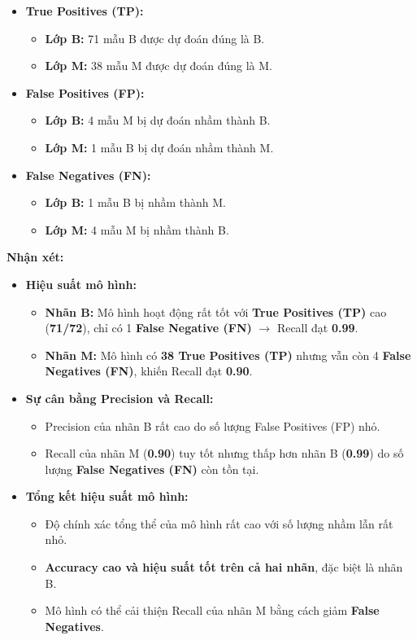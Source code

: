 \begin{itemize}
	\item \textbf{True Positives (TP):}
	\begin{itemize}
		\item \textbf{Lớp B:} 71 mẫu B được dự đoán đúng là B.
		\item \textbf{Lớp M:} 38 mẫu M được dự đoán đúng là M.
	\end{itemize}
	
	\item \textbf{False Positives (FP):}
	\begin{itemize}
		\item \textbf{Lớp B:} 4 mẫu M bị dự đoán nhầm thành B.
		\item \textbf{Lớp M:} 1 mẫu B bị dự đoán nhầm thành M.
	\end{itemize}
	
	\item \textbf{False Negatives (FN):}
	\begin{itemize}
		\item \textbf{Lớp B:} 1 mẫu B bị nhầm thành M.
		\item \textbf{Lớp M:} 4 mẫu M bị nhầm thành B.
	\end{itemize}
\end{itemize}

\textbf{Nhận xét:}
\begin{itemize}
	\item \textbf{Hiệu suất mô hình:}
	\begin{itemize}
		\item \textbf{Nhãn B:} Mô hình hoạt động rất tốt với \textbf{True Positives (TP)} cao (\textbf{71/72}), chỉ có 1 \textbf{False Negative (FN)} $\rightarrow$ Recall đạt \textbf{0.99}.
		\item \textbf{Nhãn M:} Mô hình có \textbf{38 True Positives (TP)} nhưng vẫn còn 4 \textbf{False Negatives (FN)}, khiến Recall đạt \textbf{0.90}.
	\end{itemize}
	
	\item \textbf{Sự cân bằng Precision và Recall:}
	\begin{itemize}
		\item Precision của nhãn B rất cao do số lượng False Positives (FP) nhỏ.
		\item Recall của nhãn M (\textbf{0.90}) tuy tốt nhưng thấp hơn nhãn B (\textbf{0.99}) do số lượng \textbf{False Negatives (FN)} còn tồn tại.
	\end{itemize}
	
	\item \textbf{Tổng kết hiệu suất mô hình:}
	\begin{itemize}
		\item Độ chính xác tổng thể của mô hình rất cao với số lượng nhầm lẫn rất nhỏ.
		\item \textbf{Accuracy cao và hiệu suất tốt trên cả hai nhãn}, đặc biệt là nhãn B.
		\item Mô hình có thể cải thiện Recall của nhãn M bằng cách giảm \textbf{False Negatives}.
	\end{itemize}
\end{itemize}



